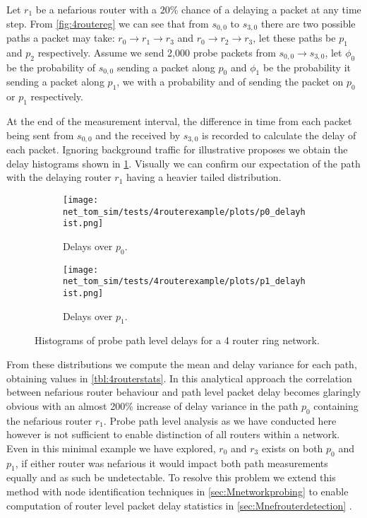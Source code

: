 Let $r_1$ be a nefarious router with a $20\%$ chance of a delaying a packet at any time step. From \ref{fig:4routereg} we can see that from $s_{0,0}$ to $s_{3,0}$ there are two possible paths a packet may take: $r_0\rightarrow r_1\rightarrow r_3$ and $r_0\rightarrow r_2\rightarrow r_3$, let these paths be $p_1$ and $p_2$ respectively. Assume we send 2,000 probe packets from $s_{0,0}\rightarrow s_{3,0}$, let $\phi_0$ be the probability of $s_{0,0}$ sending a packet along $p_0$ and $\phi_1$ be the probability it sending a packet along $p_1$, we with a probability and  of sending the packet on $p_0$ or $p_1$ respectively.\par
At the end of the measurement interval, the difference in time from each packet being sent from $s_{0,0}$ and the received by $s_{3,0}$ is recorded to calculate the delay of each packet. Ignoring background traffic for illustrative proposes we obtain the delay histograms shown in \cref{fig:ppdelayhist}. Visually we can confirm our expectation of the path with the delaying router $r_1$ having a heavier tailed distribution.\par
\begin{figure}[H]
    \begin{subfigure}[b]{0.475\textwidth}
        \texttt{[image: net\_tom\_sim/tests/4routerexample/plots/p0\_delayhist.png]}
        \caption[]{Delays over $p_0$.}
    \end{subfigure}
    \begin{subfigure}[b]{0.475\textwidth}
        \texttt{[image: net\_tom\_sim/tests/4routerexample/plots/p1\_delayhist.png]}
        \caption[]{Delays over $p_1$.}
    \end{subfigure}
    \caption{Histograms of probe path level delays for a 4 router ring network.}
    \label{fig:ppdelayhist}
\end{figure}
From these distributions we compute the mean and delay variance for each path, obtaining values in \cref{tbl:4routerstats}. In this analytical approach the correlation between nefarious router behaviour and path level packet delay becomes glaringly obvious with an almost 200\% increase of delay variance in the path $p_0$ containing the nefarious router $r_1$. Probe path level analysis as we have conducted here however is not sufficient to enable distinction of all routers within a network. Even in this minimal example we have explored, $r_0$ and $r_3$ exists on both $p_0$ and $p_1$, if either router was nefarious it would impact both path measurements equally and as such be undetectable. To resolve this problem we extend this method with node identification techniques in \cref{sec:Mnetworkprobing} to enable computation of router level packet delay statistics in \cref{sec:Mnefrouterdetection} .
